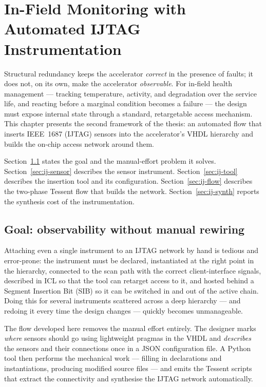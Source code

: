 \chapter{In-Field Monitoring with Automated IJTAG Instrumentation}
\label{ch:ijtag}

Structural redundancy keeps the accelerator \emph{correct} in the presence of
faults; it does not, on its own, make the accelerator \emph{observable}. For
in-field health management --- tracking temperature, activity, and degradation
over the service life, and reacting before a marginal condition becomes a failure
--- the design must expose internal state through a standard, retargetable
access mechanism. This chapter presents the second framework of the thesis: an
automated flow that inserts IEEE~1687 (IJTAG) sensors into the accelerator's
VHDL hierarchy and builds the on-chip access network around them.

Section~\ref{sec:ij-goal} states the goal and the manual-effort problem it
solves. Section~\ref{sec:ij-sensor} describes the sensor instrument.
Section~\ref{sec:ij-tool} describes the insertion tool and its
configuration. Section~\ref{sec:ij-flow} describes the two-phase Tessent flow
that builds the network. Section~\ref{sec:ij-synth} reports the synthesis cost of
the instrumentation.

\section{Goal: observability without manual rewiring}
\label{sec:ij-goal}

Attaching even a single instrument to an IJTAG network by hand is tedious and
error-prone: the instrument must be declared, instantiated at the right point in
the hierarchy, connected to the scan path with the correct client-interface
signals, described in ICL so that the tool can retarget access to it, and hosted
behind a Segment Insertion Bit (SIB) so it can be switched in and out of the
active chain. Doing this for several instruments scattered across a deep
hierarchy --- and redoing it every time the design changes --- quickly becomes
unmanageable.

The flow developed here removes the manual effort entirely. The designer marks
\emph{where} sensors should go using lightweight pragmas in the VHDL and
\emph{describes} the sensors and their connections once in a JSON configuration
file. A Python tool then performs the mechanical work --- filling in
declarations and instantiations, producing modified source files --- and emits
the Tessent scripts that extract the connectivity and synthesise the IJTAG
network automatically.

